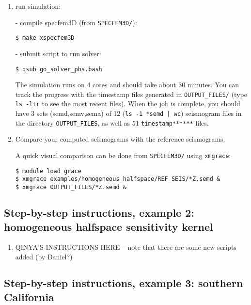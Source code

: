 \documentclass[10pt,fleqn,letterpaper]{article}
\begin{document}
\begin{enumerate}
\item run simulation:

   - compile specfem3D (from \verb+SPECFEM3D/+):
\begin{lstlisting}
$ make xspecfem3D
\end{lstlisting}
   - submit script to run solver:
\begin{lstlisting}
$ qsub go_solver_pbs.bash
\end{lstlisting}

The simulation runs on 4 cores and should take about 30 minutes. You can track the progress with the timestamp files generated in \verb+OUTPUT_FILES/+ (type \verb+ls -ltr+ to see the most recent files). When the job is complete, you should have 3 sets (semd,semv,sema) of 12 (\verb+ls -1 *semd | wc+) seismogram files in the directory \verb+OUTPUT_FILES+, as well as 51 \verb+timestamp******+ files.

\item Compare your computed seismograms with the reference seismograms.

A quick visual comparison can be done from \verb+SPECFEM3D/+ using \verb+xmgrace+:
\begin{lstlisting}
$ module load grace
$ xmgrace examples/homogeneous_halfspace/REF_SEIS/*Z.semd &
$ xmgrace OUTPUT_FILES/*Z.semd &
\end{lstlisting}

\end{enumerate}


\subsection*{Step-by-step instructions, example 2: homogeneous halfspace sensitivity kernel}

\begin{enumerate}
\item QINYA'S INSTRUCTIONS HERE -- note that there are some new scripts added (by Daniel?)
\end{enumerate}


\subsection*{Step-by-step instructions, example 3: southern California}
\end{document}

